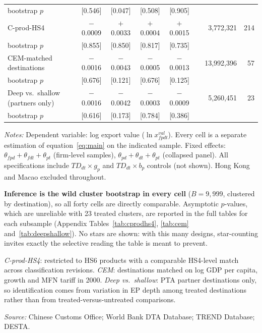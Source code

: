 \begin{table}[htbp]
\begin{threeparttable}
\begin{tabular}{lcccccrr}
\quad bootstrap $p$         & [0.546] & [0.047] & [0.508] & [0.905] & & & \\[4pt]
C-prod-HS4                  & $-$0.0009 & $+$0.0033 & $+$0.0004 & $+$0.0015 & & 3,772,321 & 214 \\
\quad bootstrap $p$         & [0.855] & [0.850] & [0.817] & [0.735] & & & \\[4pt]
CEM-matched destinations    & $-$0.0016 & $-$0.0043 & $-$0.0005 & $-$0.0013 & & 13,992,396 & 57 \\
\quad bootstrap $p$         & [0.676] & [0.121] & [0.676] & [0.125] & & & \\[4pt]
Deep vs.\ shallow (partners only) & $-$0.0016 & $-$0.0042 & $-$0.0003 & $-$0.0009 & & 5,260,451 & 23 \\
\quad bootstrap $p$         & [0.616] & [0.173] & [0.784] & [0.386] & & & \\
\bottomrule
\end{tabular}
\begin{tablenotes}[flushleft]\footnotesize
\item \textit{Notes:} Dependent variable: log export value ($\ln x^{val}_{fpdt}$). Every cell is a separate
  estimation of equation~\eqref{eq:main} on the indicated sample. Fixed effects: $\theta_{fpd} + \theta_{fdt} + \theta_{pt}$
  (firm-level samples), $\theta_{pd} + \theta_{dt} + \theta_{pt}$ (collapsed panel). All specifications include
  $TD_{dt} \times g_p$ and $TD_{dt} \times b_p$ controls (not shown). Hong Kong and Macao excluded throughout.
\item \textbf{Inference is the wild cluster bootstrap in every cell} ($B = 9{,}999$, clustered by destination),
  so all forty cells are directly comparable. Asymptotic $p$-values, which are unreliable with 23 treated
  clusters, are reported in the full tables for each subsample (Appendix Tables~\ref{tab:cprodhs4},
  \ref{tab:cem} and~\ref{tab:deepshallow}). No stars are shown: with this many designs, star-counting invites
  exactly the selective reading the table is meant to prevent.
\item \textit{C-prod-HS4}: restricted to HS6 products with a comparable HS4-level match across classification
  revisions. \textit{CEM}: destinations matched on log GDP per capita, growth and MFN tariff in 2000.
  \textit{Deep vs.\ shallow}: PTA partner destinations only, so identification comes from variation in EP
  depth among treated destinations rather than from treated-versus-untreated comparisons.
\item \textit{Source:} Chinese Customs Office; World Bank DTA Database; TREND Database; DESTA.
\end{tablenotes}
\end{threeparttable}
\end{table}
